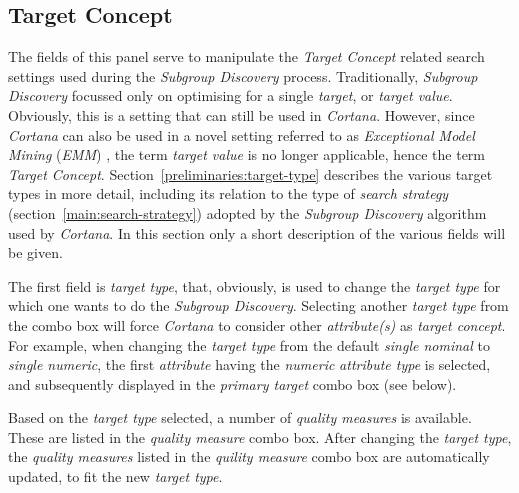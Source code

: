\documentclass{article}
\begin{document}
\subsection{Target Concept}
\label{main:target-concept}
The fields of this panel serve to manipulate the \emph{Target Concept} related search settings used during the \emph{Subgroup Discovery} process.
Traditionally, \emph{Subgroup Discovery} focussed only on optimising for a single \emph{target}, or \emph{target value}.
Obviously, this is a setting that can still be used in \emph{Cortana}.
However, since \emph{Cortana} can also be used in a novel setting referred to as \emph{Exceptional Model Mining} (\emph{EMM}) \cite{emm}, the term \emph{target value} is no longer applicable, hence the term \emph{Target Concept}.
Section~\ref{preliminaries:target-type} describes the various target types in more detail, including its relation to the type of \emph{search strategy} (section~\ref{main:search-strategy}) adopted by the \emph{Subgroup Discovery} algorithm used by \emph{Cortana}.
In this section only a short description of the various fields will be given.

The first field is \emph{target type}, that, obviously, is used to change the \emph{target type} for which one wants to do the \emph{Subgroup Discovery}.
Selecting another \emph{target type} from the combo box will force \emph{Cortana} to consider other \emph{attribute(s)} as \emph{target concept}.
For example, when changing the \emph{target type} from the default \emph{single nominal} to \emph{single numeric}, the first \emph{attribute} having the \emph{numeric} \emph{attribute type} is selected, and subsequently displayed in the \emph{primary target} combo box (see below).

Based on the \emph{target type} selected, a number of \emph{quality measures} is available.
These are listed in the \emph{quality measure} combo box.
After changing the \emph{target type}, the \emph{quality measures} listed in the \emph{quility measure} combo box are automatically updated, to fit the new \emph{target type}.
\end{document}
